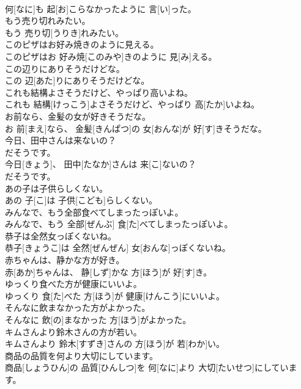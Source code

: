 \documentclass[8pt]{extreport}
\begin{document}
\begin{CJK}{UTF8}{min}
\\	何[なに]も 起[お]こらなかったように 言[い]った。	
\\	もう売り切れみたい。	
\\	もう 売り切[うりき]れみたい。	
\\	このピザはお好み焼きのように見える。	
\\	このピザはお 好み焼[このみや]きのように 見[み]える。	
\\	この辺りにありそうだけどな。	
\\	この 辺[あた]りにありそうだけどな。	
\\	これも結構よさそうだけど、やっぱり高いよね。	
\\	これも 結構[けっこう]よさそうだけど、やっぱり 高[たか]いよね。	
\\	お前なら、金髪の女が好きそうだな。	
\\	お 前[まえ]なら、 金髪[きんぱつ]の 女[おんな]が 好[す]きそうだな。	
\\	今日、田中さんは来ないの？ 
\\	だそうです。	
\\	今日[きょう]、 田中[たなか]さんは 来[こ]ないの？ 
\\	だそうです。	
\\	あの子は子供らしくない。	
\\	あの 子[こ]は 子供[こども]らしくない。	
\\	みんなで、もう全部食べてしまったっぽいよ。	
\\	みんなで、もう 全部[ぜんぶ] 食[た]べてしまったっぽいよ。	
\\	恭子は全然女っぽくないね。	
\\	恭子[きょうこ]は 全然[ぜんぜん] 女[おんな]っぽくないね。	
\\	赤ちゃんは、静かな方が好き。	
\\	赤[あか]ちゃんは、 静[しず]かな 方[ほう]が 好[す]き。	
\\	ゆっくり食べた方が健康にいいよ。	
\\	ゆっくり 食[た]べた 方[ほう]が 健康[けんこう]にいいよ。	
\\	そんなに飲まなかった方がよかった。	
\\	そんなに 飲[の]まなかった 方[ほう]がよかった。	
\\	キムさんより鈴木さんの方が若い。	
\\	キムさんより 鈴木[すずき]さんの 方[ほう]が 若[わか]い。	
\\	商品の品質を何より大切にしています。	
\\	商品[しょうひん]の 品質[ひんしつ]を 何[なに]より 大切[たいせつ]にしています。	

\end{CJK}
\end{document}
